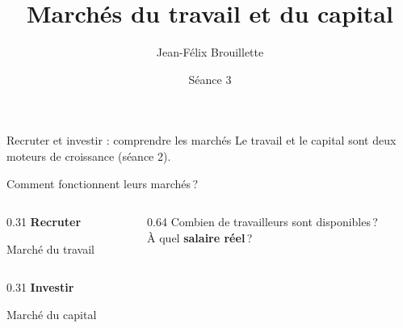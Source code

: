 \documentclass[aspectratio=169]{beamer}
\title{Marchés du travail et du capital}
\author{Jean-Félix Brouillette}
\date{Séance 3}
\begin{document}
\titleframe


\begin{frame}{Recruter et investir : comprendre les marchés}
   \normalsize\RaggedRight Le travail et le capital sont deux moteurs de croissance (séance 2).
   \par\vspace{0.1cm}
   Comment fonctionnent leurs marchés\,?
   \par\vspace{0.2cm}
   \begin{tcolorbox}[colback=HEClightgray, colframe=HEClightgray, boxrule=0pt, arc=8pt, left=10pt, right=10pt, top=10pt, bottom=10pt]
      \begin{columns}[c,onlytextwidth]
         \begin{column}{0.31\textwidth}
            \RaggedRight
            {\Large\textbf{\textcolor{HECnavy}{Recruter}}}\par\vspace{4pt}
            {\footnotesize Marché du travail}
         \end{column}
         \begin{column}{0.64\textwidth}
            \RaggedRight\small
            Combien de travailleurs sont disponibles\,?\\[5pt]
            À quel \textbf{salaire réel}\,?
         \end{column}
      \end{columns}
   \end{tcolorbox}
   \vspace{0.15cm}
   \begin{tcolorbox}[colback=HECgreen!7, colframe=HECgreen!7, boxrule=0pt, arc=8pt, left=10pt, right=10pt, top=10pt, bottom=10pt]
      \begin{columns}[c,onlytextwidth]
         \begin{column}{0.31\textwidth}
            \RaggedRight
            {\Large\textbf{\textcolor{HECgreen}{Investir}}}\par\vspace{4pt}
            {\footnotesize Marché du capital}

\end{column}
\end{columns}
\end{tcolorbox}
\end{frame}
\end{document}
